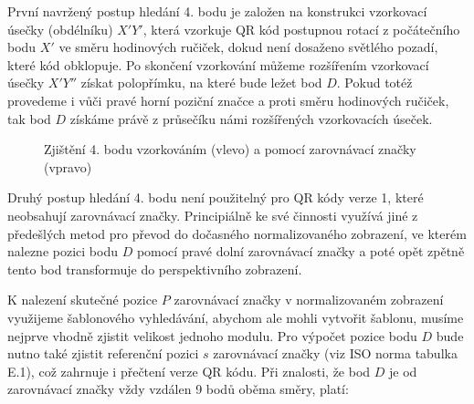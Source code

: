 První navržený postup hledání 4. bodu je založen na konstrukci vzorkovací úsečky
(obdélníku) $X'Y'$, která vzorkuje QR kód postupnou rotací z počátečního bodu 
$X'$ ve směru hodinových ručiček, dokud není dosaženo světlého pozadí, které
kód obklopuje. Po skončení vzorkování můžeme rozšířením vzorkovací úsečky 
$X'Y''$ získat polopřímku, na které bude ležet bod $D$. Pokud totéž provedeme i
vůči pravé horní poziční značce a proti směru hodinových ručiček, tak bod $D$
získáme právě z průsečíku námi rozšířených vzorkovacích úseček.

\begin{figure}[H]
  \begin{center}
    \caption{Zjištění 4. bodu vzorkováním (vlevo) a pomocí zarovnávací značky
    (vpravo)}
    \label{DeterminingTheFourthPointForTransformation}
  \end{center}
\end{figure}

Druhý postup hledání 4. bodu není použitelný pro QR kódy verze 1, které
neobsahují zarovnávací značky. Principiálně ke své činnosti využívá jiné 
z předešlých metod pro převod do dočasného normalizovaného zobrazení, ve
kterém nalezne pozici bodu $D$ pomocí pravé dolní zarovnávací značky a poté
opět zpětně tento bod transformuje do perspektivního zobrazení.

K nalezení skutečné pozice $P$ zarovnávací značky v normalizovaném zobrazení
využijeme šablonového vyhledávání, abychom ale mohli vytvořit šablonu, musíme
nejprve vhodně zjistit velikost jednoho modulu. Pro výpočet pozice bodu $D$ bude
nutno také zjistit referenční pozici $s$ zarovnávací značky (viz ISO norma
tabulka E.1), což zahrnuje i přečtení verze QR kódu. Při znalosti, že bod $D$
je od zarovnávací značky vždy vzdálen 9 bodů oběma směry, platí:

